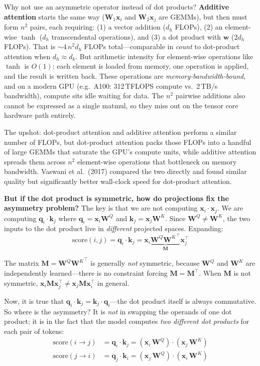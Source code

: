 \begin{whynotbox}{Why not use an asymmetric operator instead of dot products?}
\textbf{Additive attention} starts the same way ($\mathbf{W}_1 \mathbf{x}_i$ and $\mathbf{W}_2 \mathbf{x}_j$ are GEMMs), but then must form $n^2$ pairs, each requiring: (1) a vector addition ($d_h$ FLOPs), (2) an element-wise $\tanh$ ($d_h$ transcendental operations), and (3) a dot product with $\mathbf{w}$ ($2d_h$ FLOPs). That is $\sim 4\,n^2 d_h$ FLOPs total---comparable in \emph{count} to dot-product attention when $d_h \approx d_k$. But arithmetic intensity for element-wise operations like $\tanh$ is $O(1)$: each element is loaded from memory, one operation is applied, and the result is written back. These operations are \emph{memory-bandwidth-bound}, and on a modern GPU (e.g.\ A100: 312\,TFLOPS compute vs.\ 2\,TB/s bandwidth), compute sits idle waiting for data. The $n^2$ pairwise additions also cannot be expressed as a single matmul, so they miss out on the tensor core hardware path entirely.

The upshot: dot-product attention and additive attention perform a similar number of FLOPs, but dot-product attention packs those FLOPs into a handful of large GEMMs that saturate the GPU's compute units, while additive attention spreads them across $n^2$ element-wise operations that bottleneck on memory bandwidth. Vaswani et al.\ (2017) compared the two directly and found similar quality but significantly better wall-clock speed for dot-product attention.

\textbf{But if the dot product is symmetric, how do projections fix the asymmetry problem?} The key is that we are not computing $\mathbf{x}_i \cdot \mathbf{x}_j$. We are computing $\mathbf{q}_i \cdot \mathbf{k}_j$ where $\mathbf{q}_i = \mathbf{x}_i \mathbf{W}^Q$ and $\mathbf{k}_j = \mathbf{x}_j \mathbf{W}^K$. Since $\mathbf{W}^Q \neq \mathbf{W}^K$, the two inputs to the dot product live in \emph{different} projected spaces. Expanding:
\[
\text{score}(i,j) = \mathbf{q}_i \cdot \mathbf{k}_j = \mathbf{x}_i \underbrace{\mathbf{W}^Q {\mathbf{W}^K}^\top}_{\mathbf{M}} \mathbf{x}_j^\top
\]

The matrix $\mathbf{M} = \mathbf{W}^Q {\mathbf{W}^K}^\top$ is generally \emph{not} symmetric, because $\mathbf{W}^Q$ and $\mathbf{W}^K$ are independently learned---there is no constraint forcing $\mathbf{M} = \mathbf{M}^\top$. When $\mathbf{M}$ is not symmetric, $\mathbf{x}_i \mathbf{M} \mathbf{x}_j^\top \neq \mathbf{x}_j \mathbf{M} \mathbf{x}_i^\top$ in general.

Now, it is true that $\mathbf{q}_i \cdot \mathbf{k}_j = \mathbf{k}_j \cdot \mathbf{q}_i$---the dot product itself is always commutative. So where is the asymmetry? It is \emph{not} in swapping the operands of one dot product; it is in the fact that the model computes \emph{two different dot products} for each pair of tokens:
\begin{align*}
\text{score}(i \to j) &= \mathbf{q}_i \cdot \mathbf{k}_j = (\mathbf{x}_i\, \mathbf{W}^Q) \cdot (\mathbf{x}_j\, \mathbf{W}^K) \\
\text{score}(j \to i) &= \mathbf{q}_j \cdot \mathbf{k}_i = (\mathbf{x}_j\, \mathbf{W}^Q) \cdot (\mathbf{x}_i\, \mathbf{W}^K)
\end{align*}


\end{whynotbox}
